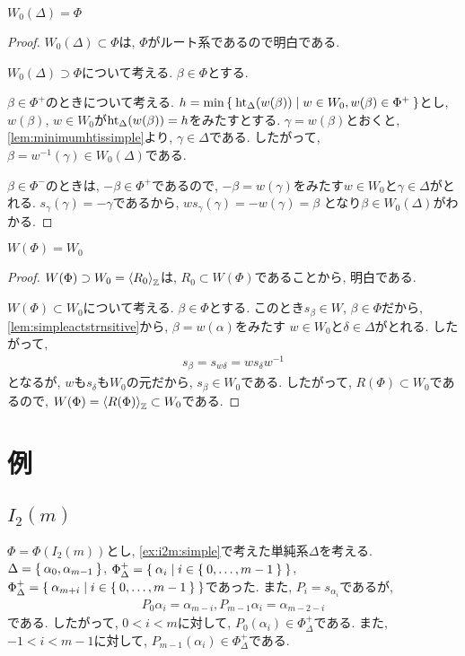 \begin{lemma}
  \label{lem:simpleactstrnsitive}
  $W_0(\Delta)=\Phi$
\end{lemma}
\begin{proof}
  $W_0(\Delta)\subset \Phi$は, $\Phi$がルート系であるので明白である.

  $W_0(\Delta)\supset \Phi$について考える.
  $\beta\in \Phi$とする.

  $\beta\in\Phi^+$のときについて考える.
  $h=\min\Set{\operatorname{ht}_\Delta(w(\beta))|w\in W_0,w(\beta)\in\Phi^+}$とし,
  $w(\beta)$, $w\in W_0$が$\operatorname{ht}_\Delta(w(\beta))=h$をみたすとする.
  $\gamma=w(\beta)$とおくと,
  \cref{lem:minimumhtissimple}より,
  $\gamma\in\Delta$である.
  したがって, $\beta=w^{-1}(\gamma)\in W_0(\Delta)$である.

  $\beta\in\Phi^-$のときは, $-\beta\in\Phi^+$であるので,
  $-\beta=w(\gamma)$をみたす$w\in W_0$と$\gamma\in\Delta$がとれる.
  $s_\gamma(\gamma)=-\gamma$であるから,
  $ws_\gamma(\gamma)=-w(\gamma)=\beta$
  となり$\beta\in W_0(\Delta)$がわかる.
\end{proof}


\begin{theorem}
  $W(\Phi)=W_0$
\end{theorem}
\begin{proof}
  $W(\Phi)\supset W_0=\Braket{R_0}_{\mathbb{Z}}$は,
  $R_0\subset W(\Phi)$であることから,
  明白である.

  $W(\Phi)\subset W_0$について考える.
  $\beta\in\Phi$とする.
  このとき$s_\beta\in W$, $\beta\in\Phi$だから,
  \cref{lem:simpleactstrnsitive}から,
  $\beta=w(\alpha)$をみたす
  $w\in W_0$と$\delta\in\Delta$がとれる.
  したがって,
  \begin{align*}
    s_\beta=s_{w\delta}=ws_\delta w^{-1}
  \end{align*}
  となるが, $w$も$s_\delta$も$W_0$の元だから,
  $s_\beta\in W_0$である.
  したがって, $R(\Phi)\subset W_0$であるので,
  $W(\Phi)=\Braket{R(\Phi)}_{\mathbb{Z}}\subset W_0$である.
\end{proof}


\section{例}

\subsection{$I_2(m)$}
$\Phi=\Phi(I_2(m))$とし,
\cref{ex:i2m:simple}で考えた単純系$\Delta$を考える.
$\Delta=\Set{\alpha_0,\alpha_{m-1}}$,
$\Phi_\Delta^+=\Set{\alpha_i|i\in\Set{0,\ldots,m-1}}$,
$\Phi_\Delta^+=\Set{\alpha_{m+i}|i\in\Set{0,\ldots,m-1}}$であった.
また, $P_i=s_{\alpha_{i}}$であるが,
\begin{align*}
P_0\alpha_i=\alpha_{m-i},
P_{m-1}\alpha_i=\alpha_{m-2-i}
\end{align*}
である.
したがって,
$0<i<m$に対して,
$P_0(\alpha_i)\in\Phi_\Delta^+$である.
また, $-1<i<m-1$に対して,
$P_{m-1}(\alpha_i)\in\Phi_\Delta^+$である.

